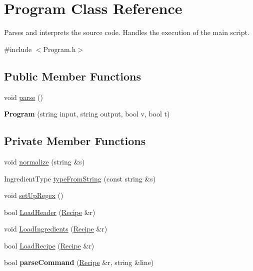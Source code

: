 \hypertarget{classProgram}{\section{Program Class Reference}
\label{classProgram}
}


Parses and interprets the source code. Handles the execution of the main script.  




{\ttfamily \#include $<$Program.\-h$>$}

\subsection*{Public Member Functions}
\begin{DoxyCompactItemize}
\item 
void \hyperlink{classProgram_a7e845a6184bade97aead63d2e14c5040}{parse} ()
\item 
\hypertarget{classProgram_aee67cabb04f36e7e0f059c1976d55601}{{\bfseries Program} (string input, string output, bool v, bool t)}\label{classProgram_aee67cabb04f36e7e0f059c1976d55601}

\end{DoxyCompactItemize}
\subsection*{Private Member Functions}
\begin{DoxyCompactItemize}
\item 
void \hyperlink{classProgram_ad5a95ba2b5f9caa0555d7d24c475f502}{normalize} (string \&s)
\item 
Ingredient\-Type \hyperlink{classProgram_aa97b3ca0f048f04847e6be90581cf756}{type\-From\-String} (const string \&s)
\item 
void \hyperlink{classProgram_a20fc155df19b3cfc73901e31f2fad53d}{set\-Up\-Regex} ()
\item 
bool \hyperlink{classProgram_a4e8ea37034e515f7c21d3fb3cc119765}{Load\-Header} (\hyperlink{classRecipe}{Recipe} \&r)
\item 
void \hyperlink{classProgram_a277650f0e2ae017e8171aee4fbde0ae2}{Load\-Ingredients} (\hyperlink{classRecipe}{Recipe} \&r)
\item 
bool \hyperlink{classProgram_a28d7594324677db5e10aff47fa97f593}{Load\-Recipe} (\hyperlink{classRecipe}{Recipe} \&r)
\item 
\hypertarget{classProgram_a7ee14d6b0460dcb1501884db70972657}{bool {\bfseries parse\-Command} (\hyperlink{classRecipe}{Recipe} \&r, string \&line)}\label{classProgram_a7ee14d6b0460dcb1501884db70972657}

\end{DoxyCompactItemize}
